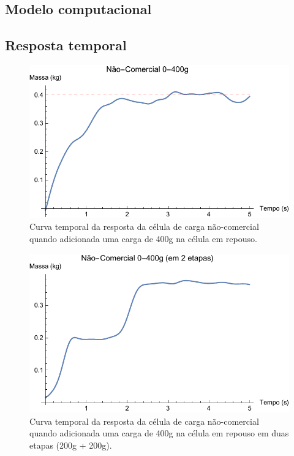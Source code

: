 \documentclass[a4paper]{instrumentacao}
\begin{document}
\subsection{Modelo computacional}


\subsection{Resposta temporal}

\begin{figure}[H]
\center
\includegraphics[width=\textwidth]{NaoComercial_0-400g.pdf}
\caption{Curva temporal da resposta da célula de carga não-comercial quando adicionada uma carga de 400g na célula em repouso.}
\label{fig:celula-nao-comercial-resultado-0-400g}
\end{figure}

\begin{figure}[H]
\center
\includegraphics[width=\textwidth]{NaoComercial_0-400g_etapa.pdf}
\caption{Curva temporal da resposta da célula de carga não-comercial quando adicionada uma carga de 400g na célula em repouso em duas etapas (200g + 200g).}
\label{fig:celula-nao-comercial-resultado-0-400g-etapa}
\end{figure}
\end{document}
